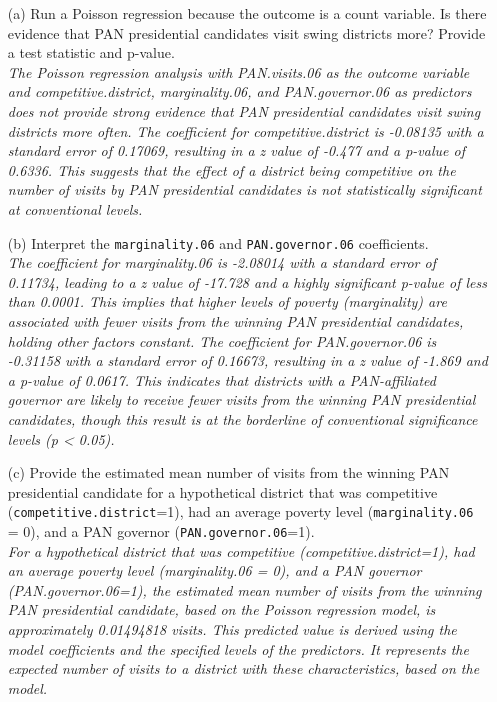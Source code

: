\documentclass[12pt,letterpaper]{article}
\begin{document}
\begin{enumerate}
	\item [(a)]
	Run a Poisson regression because the outcome is a count variable. Is there evidence that PAN presidential candidates visit swing districts more? Provide a test statistic and p-value.\\
\noindent \textit{The Poisson regression analysis with PAN.visits.06 as the outcome variable and competitive.district, marginality.06, and PAN.governor.06 as predictors does not provide strong evidence that PAN presidential candidates visit swing districts more often. The coefficient for competitive.district is -0.08135 with a standard error of 0.17069, resulting in a z value of -0.477 and a p-value of 0.6336. This suggests that the effect of a district being competitive on the number of visits by PAN presidential candidates is not statistically significant at conventional levels.}
	\item [(b)]
	Interpret the \texttt{marginality.06} and \texttt{PAN.governor.06} coefficients.\\
\noindent \textit{The coefficient for marginality.06 is -2.08014 with a standard error of 0.11734, leading to a z value of -17.728 and a highly significant p-value of less than 0.0001. This implies that higher levels of poverty (marginality) are associated with fewer visits from the winning PAN presidential candidates, holding other factors constant. The coefficient for PAN.governor.06 is -0.31158 with a standard error of 0.16673, resulting in a z value of -1.869 and a p-value of 0.0617. This indicates that districts with a PAN-affiliated governor are likely to receive fewer visits from the winning PAN presidential candidates, though this result is at the borderline of conventional significance levels (p < 0.05).}
	
	\item [(c)]
	Provide the estimated mean number of visits from the winning PAN presidential candidate for a hypothetical district that was competitive (\texttt{competitive.district}=1), had an average poverty level (\texttt{marginality.06} = 0), and a PAN governor (\texttt{PAN.governor.06}=1).\\
\noindent \textit{For a hypothetical district that was competitive (competitive.district=1), had an average poverty level (marginality.06 = 0), and a PAN governor (PAN.governor.06=1), the estimated mean number of visits from the winning PAN presidential candidate, based on the Poisson regression model, is approximately 0.01494818 visits. This predicted value is derived using the model coefficients and the specified levels of the predictors. It represents the expected number of visits to a district with these characteristics, based on the model.}
	
\end{enumerate}
\end{document}

